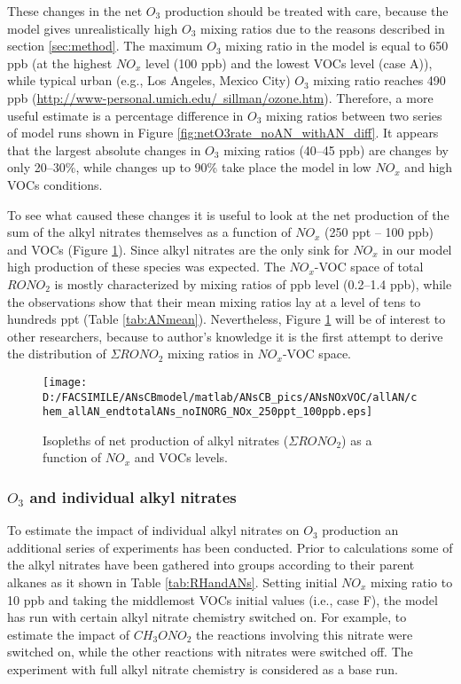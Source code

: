 \documentclass[11pt,a4paper]{article}
\begin{document}
These changes in the net $O_3$ production should be treated with care, because the model gives unrealistically high $O_3$ mixing ratios due to the reasons described in section \ref{sec:method}. The maximum $O_3$ mixing ratio in the model is equal to 650 ppb (at the highest $NO_x$ level (100 ppb) and the lowest VOCs level (case A)), while typical urban (e.g., Los Angeles, Mexico City) $O_3$ mixing ratio reaches 490 ppb (\href{http://www-personal.umich.edu/~sillman/ozone.htm}{http://www-personal.umich.edu/~sillman/ozone.htm}). Therefore, a more useful estimate is a percentage difference in $O_3$ mixing ratios between two series of model runs shown in Figure \ref{fig:netO3rate_noAN_withAN_diff}. It appears that the largest absolute changes in $O_3$ mixing ratios (40--45 ppb) are changes by only 20--30\%, while changes up to 90\% take place the model in low $NO_x$ and high VOCs conditions.

To see what caused these changes it is useful to look at the net production of the sum of the alkyl nitrates themselves as a function of $NO_x$ (250 ppt -- 100 ppb) and VOCs (Figure \ref{fig:endtotalANs}). Since alkyl nitrates are the only sink for $NO_x$ in our model high production of these species was expected. The $NO_x$-VOC space of total $RONO_2$ is mostly characterized by mixing ratios of ppb level (0.2--1.4 ppb), while the observations show that their mean mixing ratios lay at a level of tens to hundreds ppt (Table \ref{tab:ANmean}). Nevertheless, Figure \ref{fig:endtotalANs} will be of interest to other researchers, because to author's knowledge it is the first attempt to derive the distribution of $\Sigma RONO_2$ mixing ratios in $NO_x$-VOC space.

\begin{figure} %
\centering
\texttt{[image: D:/FACSIMILE/ANsCBmodel/matlab/ANsCB\_pics/ANsNOxVOC/allAN/chem\_allAN\_endtotalANs\_noINORG\_NOx\_250ppt\_100ppb.eps]}
\caption{Isopleths of net production of alkyl nitrates ($\Sigma RONO_2$) as a function of $NO_x$ and VOCs levels.}\label{fig:endtotalANs}
\end{figure}

\subsubsection{$O_3$ and individual alkyl nitrates}

To estimate the impact of individual alkyl nitrates on $O_3$ production an additional series of experiments has been conducted. Prior to calculations some of the alkyl nitrates have been gathered into groups according to their parent alkanes as it shown in Table \ref{tab:RHandANs}. Setting initial $NO_x$ mixing ratio to 10 ppb and taking the middlemost VOCs initial values (i.e., case F), the model has run with certain alkyl nitrate chemistry switched on. For example, to estimate the impact of $CH_3ONO_2$ the reactions involving this nitrate were switched on, while the other reactions with nitrates were switched off. The experiment with full alkyl nitrate chemistry is considered as a base run.
\end{document}
